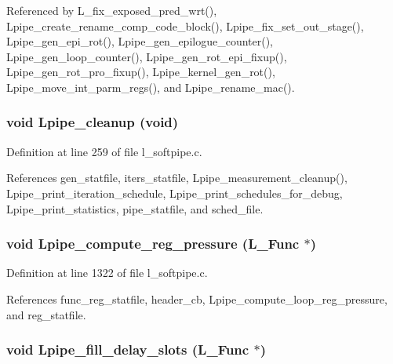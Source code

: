 Referenced by L\_\-fix\_\-exposed\_\-pred\_\-wrt(), Lpipe\_\-create\_\-rename\_\-comp\_\-code\_\-block(), Lpipe\_\-fix\_\-set\_\-out\_\-stage(), Lpipe\_\-gen\_\-epi\_\-rot(), Lpipe\_\-gen\_\-epilogue\_\-counter(), Lpipe\_\-gen\_\-loop\_\-counter(), Lpipe\_\-gen\_\-rot\_\-epi\_\-fixup(), Lpipe\_\-gen\_\-rot\_\-pro\_\-fixup(), Lpipe\_\-kernel\_\-gen\_\-rot(), Lpipe\_\-move\_\-int\_\-parm\_\-regs(), and Lpipe\_\-rename\_\-mac().
\subsubsection{\setlength{\rightskip}{0pt plus 5cm}void Lpipe\_\-cleanup (void)}\label{l__softpipe_8h_5f4f86dea88858861446d1e06c1dea15}




Definition at line 259 of file l\_\-softpipe.c.

References gen\_\-statfile, iters\_\-statfile, Lpipe\_\-measurement\_\-cleanup(), Lpipe\_\-print\_\-iteration\_\-schedule, Lpipe\_\-print\_\-schedules\_\-for\_\-debug, Lpipe\_\-print\_\-statistics, pipe\_\-statfile, and sched\_\-file.
\subsubsection{\setlength{\rightskip}{0pt plus 5cm}void Lpipe\_\-compute\_\-reg\_\-pressure (L\_\-Func $\ast$)}\label{l__softpipe_8h_543bf3b6c57a16d1555f49e4645742bc}




Definition at line 1322 of file l\_\-softpipe.c.

References func\_\-reg\_\-statfile, header\_\-cb, Lpipe\_\-compute\_\-loop\_\-reg\_\-pressure, and reg\_\-statfile.
\subsubsection{\setlength{\rightskip}{0pt plus 5cm}void Lpipe\_\-fill\_\-delay\_\-slots (L\_\-Func $\ast$)}\label{l__softpipe_8h_9f7e49adda2510d97489e2bfb1644da0}


